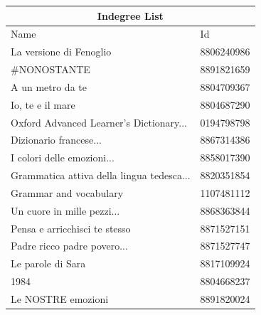\documentclass[a4paper,12pt]{article}
\begin{document}
\begin{table}[H]
	\centering
	\begin{tabular}{|l|l|}
		\hline
		\multicolumn{2}{|c|}{Indegree List}                                                  \\ \hline
		Name                                                                    & Id         \\ \hline
		La versione di Fenoglio                                                       & 8806240986 \\
		\#NONOSTANTE                                                       & 8891821659 \\
		A un metro da te                                                       & 8804709367 \\
		Io, te e il mare                                                       & 8804687290 \\
		Oxford Advanced Learner's Dictionary...                                                       & 0194798798 \\
		Dizionario francese...                                                       & 8867314386 \\
		I colori delle emozioni...                                                       & 8858017390 \\
		Grammatica attiva della lingua tedesca...                                                       & 8820351854 \\
		Grammar and vocabulary                                                       & 1107481112 \\
		Un cuore in mille pezzi...                                                       & 8868363844 \\
		Pensa e arricchisci te stesso                                                       & 8871527151 \\
		Padre ricco padre povero...                                                     & 8871527747 \\
		Le parole di Sara                                                       & 8817109924 \\
		1984                                                                    & 8804668237 \\
		Le NOSTRE emozioni                                                      & 8891820024 \\
		\hline
	\end{tabular}
\end{table}
\end{document}
